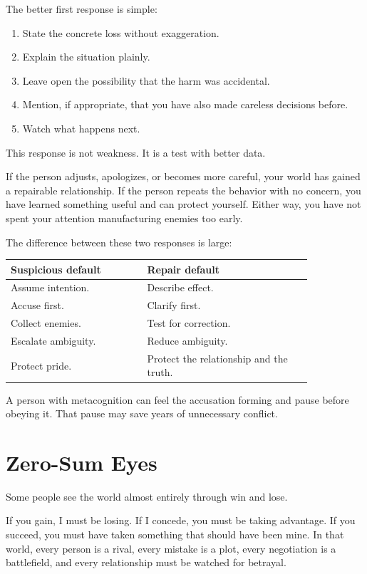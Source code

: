 The better first response is simple:

\begin{enumerate}
\item State the concrete loss without exaggeration.
\item Explain the situation plainly.
\item Leave open the possibility that the harm was accidental.
\item Mention, if appropriate, that you have also made careless decisions before.
\item Watch what happens next.
\end{enumerate}

This response is not weakness. It is a test with better data.

If the person adjusts, apologizes, or becomes more careful, your world has gained a repairable relationship. If the person repeats the behavior with no concern, you have learned something useful and can protect yourself. Either way, you have not spent your attention manufacturing enemies too early.

The difference between these two responses is large:

\begin{center}
\begin{tabular}{p{0.38\linewidth}p{0.46\linewidth}}
\hline
Suspicious default & Repair default \\
\hline
Assume intention. & Describe effect. \\
Accuse first. & Clarify first. \\
Collect enemies. & Test for correction. \\
Escalate ambiguity. & Reduce ambiguity. \\
Protect pride. & Protect the relationship and the truth. \\
\hline
\end{tabular}
\end{center}

A person with metacognition can feel the accusation forming and pause before obeying it. That pause may save years of unnecessary conflict.

\section*{Zero-Sum Eyes}

Some people see the world almost entirely through win and lose.

If you gain, I must be losing. If I concede, you must be taking advantage. If you succeed, you must have taken something that should have been mine. In that world, every person is a rival, every mistake is a plot, every negotiation is a battlefield, and every relationship must be watched for betrayal.

